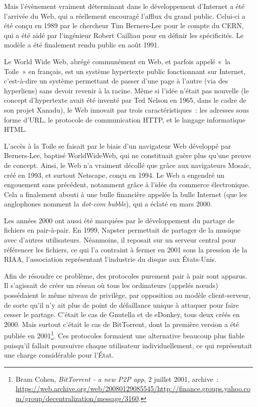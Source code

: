 \documentclass[
  a5paper,
  smalldemyvopaper,10pt,twoside,onecolumn,openright,extrafontsizes,hidelinks]{memoir}
\begin{document}
Mais l'évènement vraiment déterminant dans le développement d'Internet a
été l'arrivée du Web, qui a réellement encouragé l'afflux du grand
public. Celui-ci a été conçu en 1989 par le chercheur Tim Berners-Lee
pour le compte du CERN, qui a été aidé par l'ingénieur Robert Cailliau
pour en définir les spécificités. Le modèle a été finalement rendu
public en août 1991.

Le World Wide Web, abrégé communément en Web, et parfois appelé «~la
Toile~» en français, est un système hypertexte public fonctionnant sur
Internet, c'est-à-dire un système permettant de passer d'une page à
l'autre (via des hyperliens) sans devoir revenir à la racine. Même si
l'idée n'était pas nouvelle (le concept d'hypertexte avait été inventé
par Ted Nelson en 1965, dans le cadre de son projet Xanadu), le Web
innovait par trois caractéristiques~: les adresses sous forme d'URL, le
protocole de communication HTTP, et le langage informatique HTML.

L'accès à la Toile se faisait par le biais d'un navigateur Web développé
par Berners-Lee, baptisé WorldWideWeb, qui ne constituait guère plus
qu'une preuve de concept. Ainsi, le Web n'a vraiment décollé que grâce
aux navigateurs Mosaic, créé en 1993, et surtout Netscape, conçu en
1994. Le Web a engendré un engouement sans précédent, notamment grâce à
l'idée du commerce électronique. Cela a finalement abouti à une bulle
financière appelée la bulle Internet (que les anglophones nomment la
\emph{dot-com bubble}), qui a éclaté en mars 2000.

Les années 2000 ont aussi été marquées par le développement du partage
de fichiers en pair-à-pair. En 1999, Napster permettait de partager de
la musique avec d'autres utilisateurs. Néanmoins, il reposait sur un
serveur central pour référencer les fichiers, ce qui l'a contraint à
fermer en 2001 sous la pression de la RIAA, l'association représentant
l'industrie du disque aux États-Unis.

Afin de résoudre ce problème, des protocoles purement pair à pair sont
apparus. Il s'agissait de créer un réseau où tous les ordinateurs
(appelés nœuds) possédaient le même niveau de privilège, par opposition
au modèle client-serveur, de sorte qu'il n'y ait plus de point de
défaillance unique à attaquer pour faire cesser le partage. C'était le
cas de Gnutella et de eDonkey, tous deux créés en 2000. Mais surtout
c'était le cas de BitTorrent, dont la première version a été publiée en
2001\footnote{Bram Cohen, \emph{BitTorrent - a new P2P app}, 2 juillet
  2001, archive~:
  \url{https://web.archive.org/web/20080129085545/http://finance.groups.yahoo.com/group/decentralization/message/3160}.}.
Ces protocoles formaient une alternative beaucoup plus fiable puisqu'il
fallait poursuivre chaque utilisateur individuellement, ce qui
représentait une charge considérable pour l'État.
\end{document}

